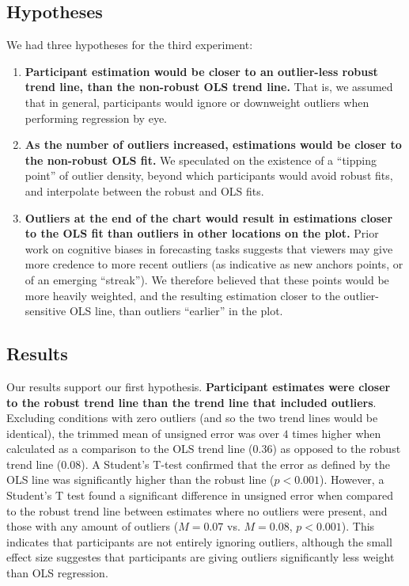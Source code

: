 \documentclass{sigchi}
\begin{document}
\subsection{Hypotheses}

We had three hypotheses for the third experiment:
\begin{enumerate}
	\item \textbf{Participant estimation would be closer to an outlier-less robust trend line, than the non-robust OLS trend line.} That is, we assumed that in general, participants would ignore or downweight outliers when performing regression by eye.
	\item \textbf{As the number of outliers increased, estimations would be closer to the non-robust OLS fit.} We speculated on the existence of a ``tipping point'' of outlier density, beyond which participants would avoid robust fits, and interpolate between the robust and OLS fits.
	\item \textbf{Outliers at the end of the chart would result in estimations closer to the OLS fit than outliers in other locations on the plot.} Prior work on cognitive biases in forecasting tasks suggests that viewers may give more credence to more recent outliers (as indicative as new anchors points, or of an emerging ``streak''). We therefore believed that these points would be more heavily weighted, and the resulting estimation closer to the outlier-sensitive OLS line, than outliers ``earlier'' in the plot.
\end{enumerate}
\subsection{Results}

Our results support our first hypothesis. \textbf{Participant estimates were closer to the robust trend line than the trend line that included outliers}. Excluding conditions with zero outliers (and so the two trend lines would be identical), the trimmed mean of unsigned error was over $4$ times higher when calculated as a comparison to the OLS trend line ($0.36$) as opposed to the robust trend line ($0.08$). A Student's T-test confirmed that the error as defined by the OLS line was significantly higher than the robust line ($p<0.001$). However, a Student's T test found a significant difference in unsigned error when compared to the robust trend line between estimates where no outliers were present, and those with any amount of outliers ($M=0.07$ vs. $M=0.08$, $p<0.001$). This indicates that participants are not entirely ignoring outliers, although the small effect size suggestes that participants are giving outliers significantly less weight than OLS regression.
\end{document}
